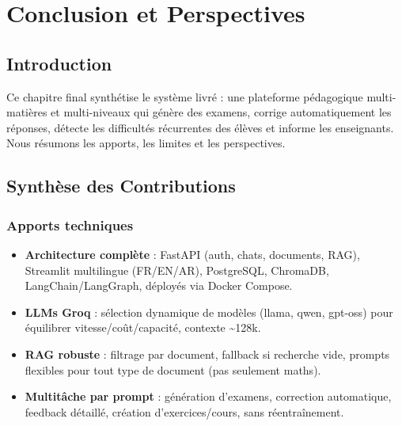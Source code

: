 
\chapter{Conclusion et Perspectives}

\section{Introduction}

Ce chapitre final synthétise le système livré : une plateforme pédagogique multi-matières et multi-niveaux qui génère des examens, corrige automatiquement les réponses, détecte les difficultés récurrentes des élèves et informe les enseignants. Nous résumons les apports, les limites et les perspectives.

\section{Synthèse des Contributions}

\subsection{Apports techniques}
\begin{itemize}
    \item \textbf{Architecture complète} : FastAPI (auth, chats, documents, RAG), Streamlit multilingue (FR/EN/AR), PostgreSQL, ChromaDB, LangChain/LangGraph, déployés via Docker Compose.
    \item \textbf{LLMs Groq} : sélection dynamique de modèles (llama, qwen, gpt-oss) pour équilibrer vitesse/coût/capacité, contexte \textasciitilde{}128k.
    \item \textbf{RAG robuste} : filtrage par document, fallback si recherche vide, prompts flexibles pour tout type de document (pas seulement maths).
    \item \textbf{Multitâche par prompt} : génération d’examens, correction automatique, feedback détaillé, création d’exercices/cours, sans réentraînement.
\end{itemize}

